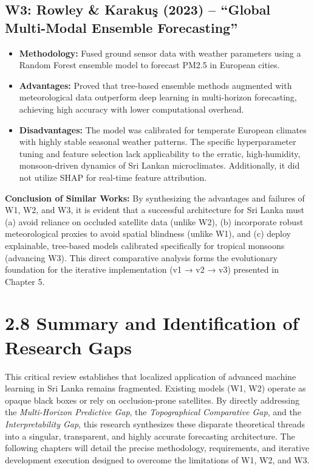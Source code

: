 \subsection{W3: Rowley \& Karakuş (2023) -- ``Global Multi-Modal
Ensemble
Forecasting''}\label{w3-rowley-karakuux15f-2023-global-multi-modal-ensemble-forecasting}

\begin{itemize}
\tightlist
\item
  \textbf{Methodology:} Fused ground sensor data with weather parameters
  using a Random Forest ensemble model to forecast PM2.5 in European
  cities.
\item
  \textbf{Advantages:} Proved that tree-based ensemble methods augmented
  with meteorological data outperform deep learning in multi-horizon
  forecasting, achieving high accuracy with lower computational
  overhead.
\item
  \textbf{Disadvantages:} The model was calibrated for temperate
  European climates with highly stable seasonal weather patterns. The
  specific hyperparameter tuning and feature selection lack
  applicability to the erratic, high-humidity, monsoon-driven dynamics
  of Sri Lankan microclimates. Additionally, it did not utilize SHAP for
  real-time feature attribution.
\end{itemize}

\textbf{Conclusion of Similar Works:} By synthesizing the advantages and
failures of W1, W2, and W3, it is evident that a successful architecture
for Sri Lanka must (a) avoid reliance on occluded satellite data (unlike
W2), (b) incorporate robust meteorological proxies to avoid spatial
blindness (unlike W1), and (c) deploy explainable, tree-based models
calibrated specifically for tropical monsoons (advancing W3). This
direct comparative analysis forms the evolutionary foundation for the
iterative implementation (v1 → v2 → v3) presented in Chapter 5.

\section{2.8 Summary and Identification of Research
Gaps}\label{summary-and-identification-of-research-gaps}

This critical review establishes that localized application of advanced
machine learning in Sri Lanka remains fragmented. Existing models (W1,
W2) operate as opaque black boxes or rely on occlusion-prone satellites.
By directly addressing the \emph{Multi-Horizon Predictive Gap}, the
\emph{Topographical Comparative Gap}, and the \emph{Interpretability
Gap}, this research synthesizes these disparate theoretical threads into
a singular, transparent, and highly accurate forecasting architecture.
The following chapters will detail the precise methodology,
requirements, and iterative development execution designed to overcome
the limitations of W1, W2, and W3.
